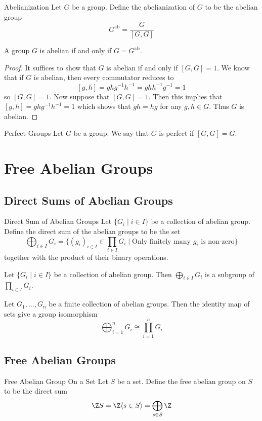 \documentclass[a4paper]{article}
\begin{document}
\begin{defn}{Abelianization}{} Let $G$ be a group. Define the abelianization of $G$ to be the abelian group $$G^\text{ab}=\frac{G}{[G,G]}$$
\end{defn}

\begin{prp}{}{} A group $G$ is abelian if and only if $G=G^\text{ab}$. \tcbline
\begin{proof}
It suffices to show that $G$ is abelian if and only if $[G,G]=1$. We know that if $G$ is abelian, then every commutator reduces to $$[g,h]=ghg^{-1}h^{-1}=ghh^{-1}g^{-1}=1$$ so $[G,G]=1$. Now suppose that $[G,G]=1$. Then this implies that $[g,h]=ghg^{-1}h^{-1}=1$ which shows that $gh=hg$ for any $g,h\in G$. Thus $G$ is abelian. 
\end{proof}
\end{prp}

\begin{defn}{Perfect Groups}{} Let $G$ be a group. We say that $G$ is perfect if $[G,G]=G$. 
\end{defn}

\pagebreak
\section{Free Abelian Groups}
\subsection{Direct Sums of Abelian Groups}
\begin{defn}{Direct Sum of Abelian Groups}{} Let $\{G_i\;|\;i\in I\}$ be a collection of abelian group. Define the direct sum of the abelian groups to be the set $$\bigoplus_{i\in I}G_i=\{(g_i)_{i\in I}\in\prod_{i\in I}G_i\;|\;\text{Only finitely many }g_i\text{ is non-zero}\}$$ together with the product of their binary operations. 
\end{defn}

\begin{lmm}{}{} Let $\{G_i\;|\;i\in I\}$ be a collection of abelian group. Then $\bigoplus_{i\in I}G_i$ is a subgroup of $\prod_{i\in I}G_i$. 
\end{lmm}

\begin{lmm}{}{} Let $G_1,\dots,G_n$ be a finite collection of abelian groups. Then the identity map of sets give a group isomorphism $$\bigoplus_{i=1}^nG_i\cong\prod_{i=1}^nG_i$$
\end{lmm}

\subsection{Free Abelian Groups}
\begin{defn}{Free Abelian Group On a Set}{} Let $S$ be a set. Define the free abelian group on $S$ to be the direct sum $$\Z S=\Z\langle s\in S\rangle=\bigoplus_{s\in S}\Z$$ 
\end{defn}
\end{document}
